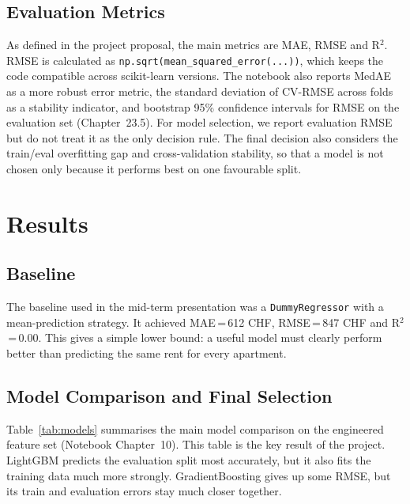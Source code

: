 \documentclass[11pt,a4paper]{article}
\begin{document}
\subsection{Evaluation Metrics}
As defined in the project proposal, the main metrics are MAE, RMSE and R$^2$. RMSE is calculated as \texttt{np.sqrt(mean\_squared\_error(...))}, which keeps the code compatible across scikit-learn versions. The notebook also reports MedAE as a more robust error metric, the standard deviation of CV-RMSE across folds as a stability indicator, and bootstrap 95\% confidence intervals for RMSE on the evaluation set (Chapter~23.5). For model selection, we report evaluation RMSE but do not treat it as the only decision rule. The final decision also considers the train/eval overfitting gap and cross-validation stability, so that a model is not chosen only because it performs best on one favourable split.

\section{Results}
\label{sec:results}

\subsection{Baseline}
The baseline used in the mid-term presentation was a \texttt{DummyRegressor} with a mean-prediction strategy. It achieved MAE\,=\,612 CHF, RMSE\,=\,847 CHF and R$^2$\,=\,0.00. This gives a simple lower bound: a useful model must clearly perform better than predicting the same rent for every apartment.

\subsection{Model Comparison and Final Selection}
Table~\ref{tab:models} summarises the main model comparison on the engineered feature set (Notebook Chapter~10). This table is the key result of the project. LightGBM predicts the evaluation split most accurately, but it also fits the training data much more strongly. GradientBoosting gives up some RMSE, but its train and evaluation errors stay much closer together.
\end{document}
